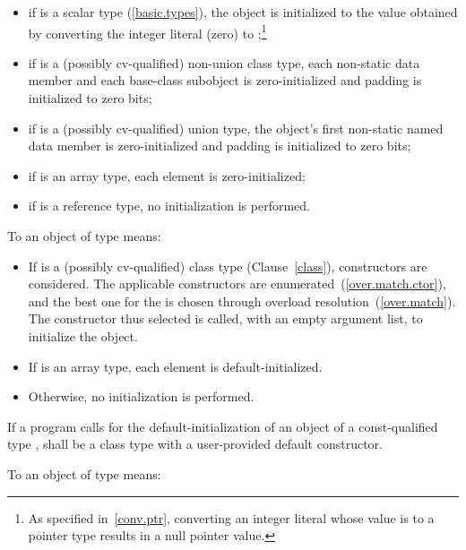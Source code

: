 \begin{itemize}
\item
if
is a scalar type (\ref{basic.types}), the
object
is initialized to the value obtained by converting the integer literal 
(zero) to
;\footnote{As specified in~\ref{conv.ptr}, converting an integer
literal whose value is
to a pointer type results in a null pointer value.
}

\item
if
is a (possibly cv-qualified) non-union class type,
each non-static data member and each
base-class subobject is zero-initialized and padding is initialized to zero bits;

\item
if
is a (possibly cv-qualified) union type,
the
object's first non-static named
data member
is zero-initialized and padding is initialized to zero bits;

\item
if
is an array type,
each element is zero-initialized;
\item
if
is a reference type, no initialization is performed.
\end{itemize}

\pnum
{}%
To
an object of type
means:

\begin{itemize}
\item
If
is a (possibly cv-qualified) class type (Clause~\ref{class}),
constructors are considered. The applicable constructors are
enumerated~(\ref{over.match.ctor}), and the best one for the
 \tcode{()} is chosen through
overload resolution~(\ref{over.match}). The constructor thus selected
is called, with an empty argument list, to initialize the object.

\item
If
is an array type, each element is default-initialized.

\item
Otherwise,
no initialization is performed.
\end{itemize}

If a program calls for the default-initialization of an object of a
const-qualified type ,  shall be a class type with a user-provided default constructor.

\pnum
{}%
To
an object of type
means:

